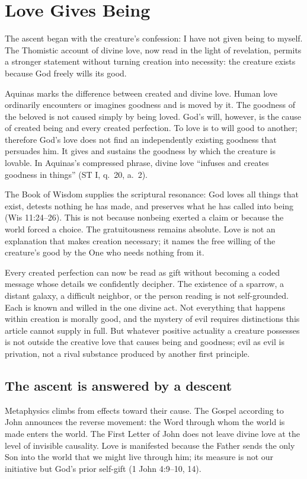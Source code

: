 \section{Love Gives Being}

The ascent began with the creature's confession: I have not given being to myself. The Thomistic account of divine love, now read in the light of revelation, permits a stronger statement without turning creation into necessity: the creature exists because God freely wills its good.

Aquinas marks the difference between created and divine love. Human love ordinarily encounters or imagines goodness and is moved by it. The goodness of the beloved is not caused simply by being loved. God's will, however, is the cause of created being and every created perfection. To love is to will good to another; therefore God's love does not find an independently existing goodness that persuades him. It gives and sustains the goodness by which the creature is lovable. In Aquinas's compressed phrase, divine love ``infuses and creates goodness in things'' (ST I, q.~20, a.~2).

The Book of Wisdom supplies the scriptural resonance: God loves all things that exist, detests nothing he has made, and preserves what he has called into being (Wis 11:24--26). This is not because nonbeing exerted a claim or because the world forced a choice. The gratuitousness remains absolute. Love is not an explanation that makes creation necessary; it names the free willing of the creature's good by the One who needs nothing from it.

Every created perfection can now be read as gift without becoming a coded message whose details we confidently decipher. The existence of a sparrow, a distant galaxy, a difficult neighbor, or the person reading is not self-grounded. Each is known and willed in the one divine act. Not everything that happens within creation is morally good, and the mystery of evil requires distinctions this article cannot supply in full. But whatever positive actuality a creature possesses is not outside the creative love that causes being and goodness; evil as evil is privation, not a rival substance produced by another first principle.

\subsection{The ascent is answered by a descent}

Metaphysics climbs from effects toward their cause. The Gospel according to John announces the reverse movement: the Word through whom the world is made enters the world. The First Letter of John does not leave divine love at the level of invisible causality. Love is manifested because the Father sends the only Son into the world that we might live through him; its measure is not our initiative but God's prior self-gift (1 John 4:9--10, 14).

